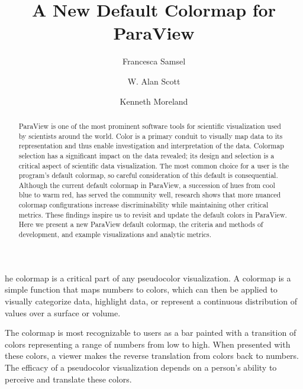 \documentclass{IEEEcsmag}
\begin{document}

\title{A New Default Colormap for ParaView}

\author{Francesca Samsel}

\author{W. Alan Scott}

\author{Kenneth Moreland}




\begin{abstract}
ParaView is one of the most prominent software tools for scientific visualization used by scientists around the world.
Color is a primary conduit to visually map data to its representation and thus enable investigation and interpretation of the data.
Colormap selection has a significant impact on the data revealed; its design and selection is a critical aspect of scientific data visualization.
The most common choice for a user is the program's default colormap, so careful consideration of this default is consequential.
Although the current default colormap in ParaView, a succession of hues from cool blue to warm red, has served the community well, research shows that more nuanced colormap configurations increase discriminability while maintaining other critical metrics. 
These findings inspire us to revisit and update the default colors in ParaView.
Here we present a new ParaView default colormap, the criteria and methods of development, and example visualizations and analytic metrics.
\end{abstract}

\maketitle

he colormap is a critical part of any pseudocolor visualization.
A colormap is a simple function that maps numbers to colors, which can then be applied to visually categorize data, highlight data, or represent a continuous distribution of values over a surface or volume.

The colormap is most recognizable to users as a bar painted with a transition of colors representing a range of numbers from low to high.  
When presented with these colors, a viewer makes the reverse translation from colors back to numbers. The efficacy of a pseudocolor visualization depends on a person's ability to perceive and translate these colors.  
\end{document}
